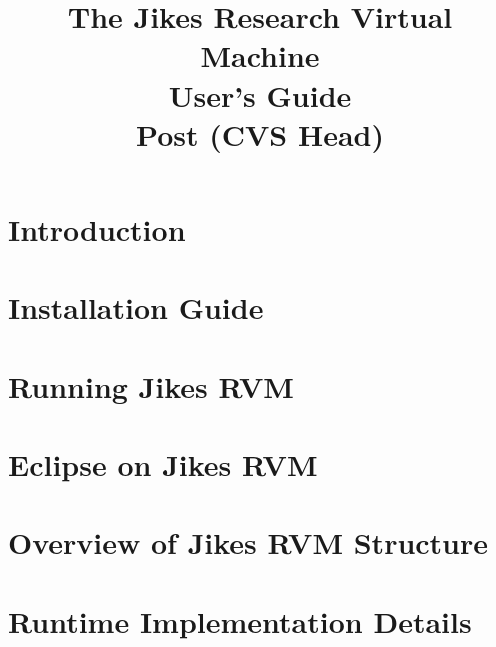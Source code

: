 \documentclass{article}
\title{\texonly{\vfill} {\huge The Jikes\TMboth{} 
Research Virtual Machine \\
User's Guide} \\ {\huge Post \version{} (CVS Head)}\\ { } \texonly{\vfill} }
\newcommand{\jrvm}{Jikes RVM}
\begin{document}
\maketitle
\date{}

\T \newpage
   \T 
   \T \cleardoublepage

\label{hlxtoc}
\T \tableofcontents
\T \listoffigures
\T \listoftables
\W {}

\T \newpage
\section{Introduction}


\T \newpage
{}
\section{Installation Guide} \label{section:installation}


\T \newpage
\section{Running \jrvm} \label{section:running}


\T \newpage
\section{Eclipse on Jikes RVM} \label{section:eclipse}


\T \newpage
{}
\section{Overview of \jrvm{} Structure}


\T \newpage
{}
\section{Runtime Implementation Details}


\T \newpage
{}
\end{document}
